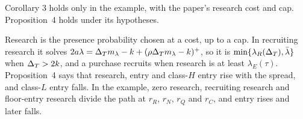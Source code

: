 \begin{watchout}
Corollary 3 holds only in the example, with the paper's research cost and cap. Proposition~4 holds under its hypotheses.
\end{watchout}

\begin{chaptersummary}
Research is the presence probability chosen at a cost, up to a cap. In recruiting research it solves
\(2a\lambda=\Delta_T m_\lambda-k+(\rho\Delta_T m_\lambda-k)^+\), so it is \(\min\{\lambda_R(\Delta_T),\bar\lambda\}\) when \(\Delta_T>2k\), and a
purchase recruits when research is at least \(\lambda_E(\tau)\). Proposition~4 says that research, entry and class-\(H\)
entry rise with the spread, and class-\(L\) entry falls. In the example, zero research, recruiting research and
floor-entry research divide the path at \(r_R\), \(r_N\), \(r_Q\) and \(r_C\), and entry rises and later falls.
\end{chaptersummary}
